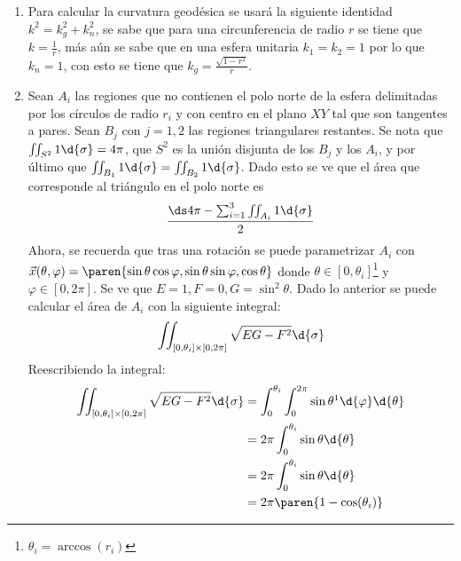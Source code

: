\documentclass{homework}
\begin{document}
\begin{sol}
    \begin{enumerate}
        \item Para calcular la curvatura geodésica se usará la siguiente identidad \(k^2=k_g^2+k_n^2\), se sabe que para una circunferencia de radio \(r\) se tiene que \(k=\frac1r\), más aún se sabe que en una esfera unitaria \(k_1=k_2=1\) por lo que \(k_n=1\), con esto se tiene que \(k_g=\frac{\sqrt{1-r^2}}r\).
        \item Sean \(A_i\) las regiones que no contienen el polo norte de la esfera delimitadas por los círculos de radio \(r_i\) y con centro en el plano \(XY\) tal que son tangentes a pares. Sean \(B_j\) con \(j=1,2\) las regiones triangulares restantes. Se nota que \(\iint_{S^2}1\d{\sigma}=4\pi\), que \(S^2\) es la unión disjunta de los \(B_j\) y los \(A_i\), y por último que \(\iint_{B_1}1\d{\sigma}=\iint_{B_2}1\d{\sigma}\). Dado esto se ve que el área que corresponde al triángulo en el polo norte es
              \begin{equation*}
                  \dfrac{\ds4\pi-\sum_{i=1}^3\iint_{A_i}1\d{\sigma}}2
              \end{equation*}
              Ahora, se recuerda que tras una rotación se puede parametrizar \(A_i\) con \(\vec{x}(\theta,\varphi)=\paren{\sin\theta\cos\varphi,\sin\theta\sin\varphi,\cos\theta}\) donde \(\theta\in[0,\theta_i]\)\footnote{\(\theta_i=\arccos(r_i)\)} y \(\varphi\in[0,2\pi]\). Se ve que \(E=1,F=0,G=\sin^2\theta\). Dado lo anterior se puede calcular el área de \(A_i\) con la siguiente integral:
              \begin{equation*}
                  \iint_{[0,\theta_i]\times[0,2\pi]}\sqrt{EG-F^2}\d{\sigma}
              \end{equation*}
              Reescribiendo la integral:
              \begin{align*}
                  \iint_{[0,\theta_i]\times[0,2\pi]}\sqrt{EG-F^2}\d{\sigma} & =\int_0^{\theta_i}\int_0^{2\pi}\sin\theta\footnotemark\d{\varphi}\d{\theta} \\
                                                                            & =2\pi\int_0^{\theta_i}\sin\theta\d{\theta}                                  \\
                                                                            & =2\pi\int_0^{\theta_i}\sin\theta\d{\theta}                                  \\
                                                                            & =2\pi\paren{1-\cos(\theta_i)}                                               \\

\end{align*}
\end{enumerate}
\end{sol}
\end{document}
